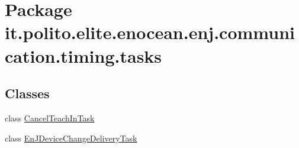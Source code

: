 \hypertarget{namespaceit_1_1polito_1_1elite_1_1enocean_1_1enj_1_1communication_1_1timing_1_1tasks}{}\section{Package it.\+polito.\+elite.\+enocean.\+enj.\+communication.\+timing.\+tasks}
\label{namespaceit_1_1polito_1_1elite_1_1enocean_1_1enj_1_1communication_1_1timing_1_1tasks}
\subsection*{Classes}
\begin{DoxyCompactItemize}
\item 
class \hyperlink{classit_1_1polito_1_1elite_1_1enocean_1_1enj_1_1communication_1_1timing_1_1tasks_1_1_cancel_teach_in_task}{Cancel\+Teach\+In\+Task}
\item 
class \hyperlink{classit_1_1polito_1_1elite_1_1enocean_1_1enj_1_1communication_1_1timing_1_1tasks_1_1_en_j_device_change_delivery_task}{En\+J\+Device\+Change\+Delivery\+Task}
\end{DoxyCompactItemize}

